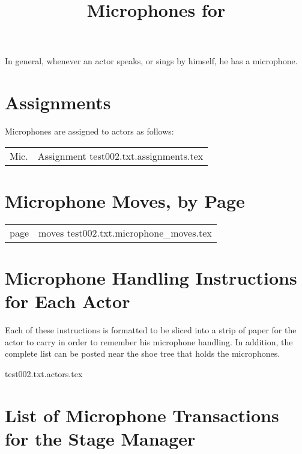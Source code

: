 \documentclass[letterpaper]{article}
\title{Microphones for {\ParameterShowName}}
\author{\ParameterDesigner}
\date{\ParameterDateNumeric}
\begin{document}
\maketitle
\tableofcontents
\newpage

In general, whenever an actor speaks, or sings by himself, he has a microphone.

\section {Assignments}
Microphones are assigned to actors as follows:

\begin{center}
\begin{longtable}{|l|m{7in}|}
\hline Mic. & Assignment \endhead \hline
 {test002.txt.assignments.tex}
\end{longtable}
\end{center}

\section {Microphone Moves, by Page}

\begin{center}
\begin{longtable}{|l|m{7in}|}
\hline page & moves \endhead \hline
 {test002.txt.microphone_moves.tex}
\end{longtable}
\end{center}

\section {Microphone Handling Instructions for Each Actor}

Each of these instructions is formatted to be sliced into a strip of paper
for the actor to carry in order to remember his microphone handling.
In addition, the complete list can be posted near the shoe tree that
holds the microphones.

\vskip 0.25in
{\setlength{\parindent}{0in}
 {test002.txt.actors.tex}
}

\section {List of Microphone Transactions for the Stage Manager}
\end{document}
